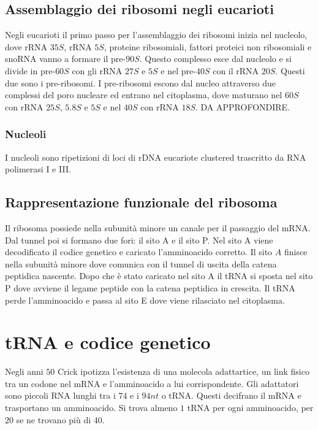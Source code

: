 \subsection{Assemblaggio dei ribosomi negli eucarioti}
Negli eucarioti il primo passo per l'assemblaggio dei ribosomi inizia nel nucleolo, dove rRNA $35S$, rRNA $5S$, proteine ribosomiali, fattori proteici non ribosomiali e snoRNA vanno a formare il pre-$90S$.
Questo complesso esce dal nucleolo e si divide in pre-$60S$ con gli rRNA $27S$ e $5S$ e nel pre-$40S$ con il rRNA $20S$. Questi due sono i pre-ribosomi. I pre-ribosomi escono dal nucleo attraverso due 
complessi del poro nucleare ed entrano nel citoplasma, dove maturano nel $60S$ con rRNA $25S$, $5.8S$ e $5S$ e nel $40S$ con rRNA $18S$. DA APPROFONDIRE.
\subsubsection{Nucleoli}
I nucleoli sono ripetizioni di loci di rDNA eucariote clustered trascritto da RNA polimerasi I e III.
\subsection{Rappresentazione funzionale del ribosoma}
Il ribosoma possiede nella subunit\`a minore un canale per il passaggio del mRNA. Dal tunnel poi si formano due fori: il sito A e il sito P. Nel sito A viene decodificato il codice genetico e caricato 
l'amminoacido corretto. Il sito $A$ finisce nella subunit\`a minore dove comunica con il tunnel di uscita della catena peptidica nascente. Dopo che \`e stato caricato nel sito A il tRNA si sposta 
nel sito P dove avviene il legame peptide con la catena peptidica in crescita. Il tRNA perde l'amminoacido e passa al sito E dove viene rilasciato nel citoplasma. 
\section{tRNA e codice genetico}
Negli anni $50$ Crick ipotizza l'esistenza di una molecola adattartice, un link fisico tra un codone nel mRNA e l'amminoacido a lui corrispondente. Gli adattatori sono piccoli RNA lunghi tra i $74$ e i 
$94nt$ o tRNA. Questi decifrano il mRNA e trasportano un amminoacido. Si trova almeno $1$ tRNA per ogni amminoacido, per $20$ se ne trovano pi\`u di $40$. 
